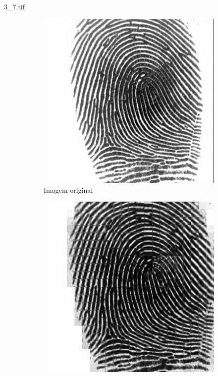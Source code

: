 \documentclass{beamer}
\begin{document}
    \begin{frame}{3\_7.tif}
        \begin{figure}
            \centering
            \begin{subfigure}[!ht]{0.32\textwidth}
                \includegraphics[width=\columnwidth]{Fingerprints/3_7.jpg}
                \caption{Imagem original}
            \end{subfigure}
            \begin{subfigure}[!ht]{0.32\textwidth}
                \includegraphics[width=\columnwidth]{Fingerprints/3_7_intermediate.jpg}

\end{subfigure}
\end{figure}
\end{frame}
\end{document}
